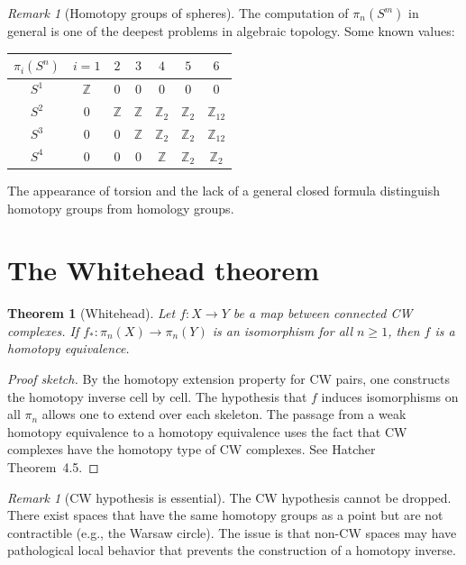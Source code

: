 \documentclass[12pt,a4paper,openany]{book}
\theoremstyle{definition}
\theoremstyle{plain}
\newtheorem{theorem}[definition]{Theorem}
\theoremstyle{remark}
\newtheorem{remark}[definition]{Remark}
\newcommand{\Z}{\mathbb{Z}}
\begin{document}
\begin{remark}[Homotopy groups of spheres]
The computation of $\pi_n(S^m)$ in general is one of the deepest
problems in algebraic topology.  Some known values:
\begin{center}
\renewcommand{\arraystretch}{1.2}
\begin{tabular}{c|cccccc}
  $\pi_i(S^n)$ & $i=1$ & $2$ & $3$ & $4$ & $5$ & $6$ \\
  \hline
  $S^1$ & $\Z$ & $0$ & $0$ & $0$ & $0$ & $0$ \\
  $S^2$ & $0$ & $\Z$ & $\Z$ & $\Z_2$ & $\Z_2$ & $\Z_{12}$ \\
  $S^3$ & $0$ & $0$ & $\Z$ & $\Z_2$ & $\Z_2$ & $\Z_{12}$ \\
  $S^4$ & $0$ & $0$ & $0$ & $\Z$ & $\Z_2$ & $\Z_2$ \\
\end{tabular}
\end{center}
The appearance of torsion and the lack of a general closed formula
distinguish homotopy groups from homology groups.
\end{remark}

\section{The Whitehead theorem}\label{sec:whitehead}

\begin{theorem}[Whitehead]\label{thm:whitehead}
Let $f\colon X\to Y$ be a map between connected CW
complexes.  If $f_*\colon\pi_n(X)\to\pi_n(Y)$ is an
isomorphism for all $n\ge1$, then $f$ is a homotopy equivalence.
\end{theorem}

\begin{proof}[Proof sketch]
By the homotopy extension property for CW pairs, one constructs the
homotopy inverse cell by cell.  The hypothesis that $f$ induces
isomorphisms on all $\pi_n$ allows one to extend over each skeleton.
The passage from a weak homotopy equivalence to a homotopy equivalence
uses the fact that CW complexes have the homotopy type of
CW complexes.  See Hatcher~\cite{hatcher} Theorem~4.5.
\end{proof}

\begin{remark}[CW hypothesis is essential]
The CW hypothesis cannot be dropped.  There exist spaces that have the
same homotopy groups as a point but are not contractible (e.g., the
Warsaw circle).  The issue is that non-CW spaces
may have pathological local behavior that prevents the construction of
a homotopy inverse.
\end{remark}
\end{document}
